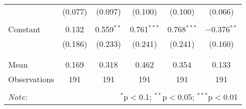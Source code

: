 \begin{tabular}{@{\extracolsep{5pt}}lccccc}
  & (0.077) & (0.097) & (0.100) & (0.100) & (0.066) \\ 
  & & & & & \\ 
 Constant & 0.132 & 0.559$^{**}$ & 0.761$^{***}$ & 0.768$^{***}$ & $-$0.376$^{**}$ \\ 
  & (0.186) & (0.233) & (0.241) & (0.241) & (0.160) \\ 
  & & & & & \\ 
\hline \\[-1.8ex] 
Mean & 0.169 & 0.318 & 0.462 & 0.354 & 0.133 \\ 
Observations & 191 & 191 & 191 & 191 & 191 \\ 
\hline 
\hline \\[-1.8ex] 
\textit{Note:}  & \multicolumn{5}{r}{$^{*}$p$<$0.1; $^{**}$p$<$0.05; $^{***}$p$<$0.01} \\ 
\end{tabular} 
